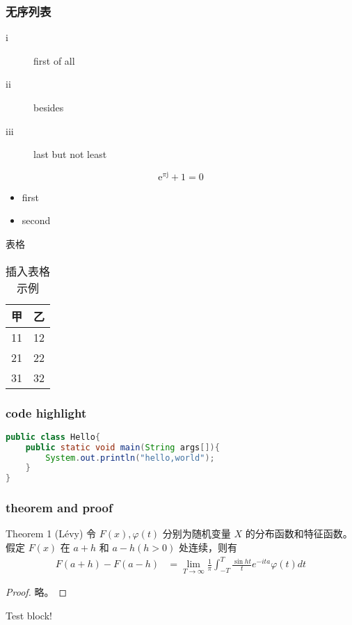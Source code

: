 \documentclass[UTF8]{beamer}
\begin{document}
\begin{frame}
    \frametitle{无序列表}
    \begin{description}
        \item[i] first of all
        \item[ii] besides
        \item[iii] last but not least
    \end{description}
    \begin{equation}
        \text{e}^{\pi \text{j}} + 1 = 0
    \end{equation}
    \begin{itemize}
        \item first
        \item second
    \end{itemize}
\end{frame}

\begin{frame}{表格}
\begin{table}[!hbp]
\centering
\begin{tabular}{c|c}
	\hline
	甲 &乙\\
	\hline
	11 & 12\\
	21 & 22\\
	31 & 32\\
	\hline
\end{tabular}
\caption{插入表格示例}
\label{tab1}
\end{table}
\end{frame}

\begin{frame}[fragile]
    \frametitle{code highlight}
    \begin{lstlisting}[language=java]
public class Hello{
    public static void main(String args[]){
        System.out.println("hello,world");
    }
}\end{lstlisting}
\end{frame}

\begin{frame}
    \frametitle{theorem and proof}
    \begin{exampleblock}{Theorem 1 (L\'{e}vy)}
    令 $F(x),\varphi(t)$ 分别为随机变量 $X$ 的分布函数和特征函数。
    假定 $F(x)$ 在 $a+h$ 和 $a-h (h>0)$ 处连续，则有
    \begin{align}
    \label{Levy theorem}  %
    F(a+h)-F(a-h)&=\lim_{T\rightarrow\infty}\frac{1}{\pi}\int^{T}_{-T}\frac{\sin ht}{t}
    e^{-ita}\varphi(t)dt
    \end{align}
    \end{exampleblock}
    \begin{proof}
        略。
    \end{proof}
    \begin{alertblock}
        Test block!
    \end{alertblock}
\end{frame}
\end{document}
